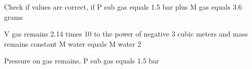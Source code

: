 Check if values are correct, if P sub gas equals 1.5 bar plus M gas equals 3.6 grams  

V gas remains 2.14 times 10 to the power of negative 3 cubic meters and mass remains constant M water equals M water 2  

Pressure on gas remains, P sub gas equals 1.5 bar
